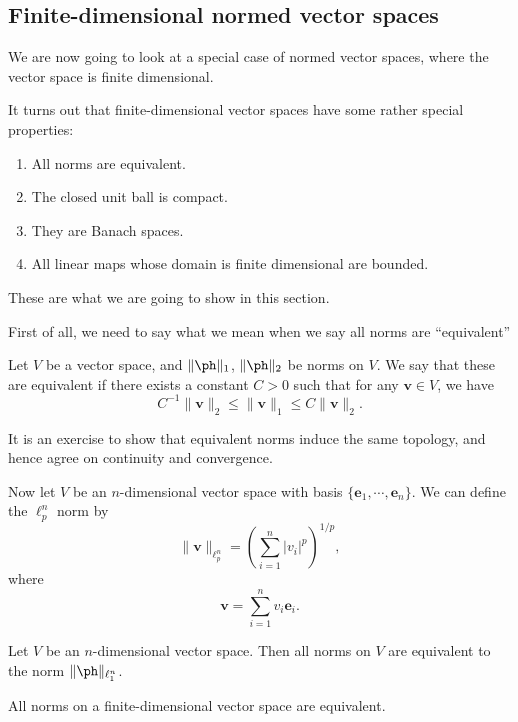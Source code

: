 \documentclass[a4paper]{article}
\begin{document}
\subsection{Finite-dimensional normed vector spaces}
We are now going to look at a special case of normed vector spaces, where the vector space is finite dimensional.

It turns out that finite-dimensional vector spaces have some rather special properties:
\begin{enumerate}
  \item All norms are equivalent.
  \item The closed unit ball is compact.
  \item They are Banach spaces.
  \item All linear maps whose domain is finite dimensional are bounded.
\end{enumerate}
These are what we are going to show in this section.

First of all, we need to say what we mean when we say all norms are ``equivalent''
\begin{defi}
  Let $V$ be a vector space, and $\|\ph \|_1$, $\|\ph \|_2$ be norms on $V$. We say that these are equivalent if there exists a constant $C > 0$ such that for any $\mathbf{v}\in V$, we have
  \[
    C^{-1}\|\mathbf{v}\|_2 \leq \|\mathbf{v}\|_1 \leq C\|\mathbf{v}\|_2.
  \]
\end{defi}
It is an exercise to show that equivalent norms induce the same topology, and hence agree on continuity and convergence.

Now let $V$ be an $n$-dimensional vector space with basis $\{\mathbf{e}_1, \cdots, \mathbf{e}_n\}$. We can define the $\ell_p^n$ norm by
\[
  \|\mathbf{v}\|_{\ell_p^n} = \left(\sum_{i = 1}^n |v_i|^p \right)^{1/p},
\]
where
\[
  \mathbf{v} = \sum_{i = 1}^n v_i \mathbf{e}_i.
\]
\begin{prop}
  Let $V$ be an $n$-dimensional vector space. Then all norms on $V$ are equivalent to the norm $\|\ph\|_{\ell_1^n}$.
\end{prop}

\begin{cor}
  All norms on a finite-dimensional vector space are equivalent.
\end{cor}
\end{document}
